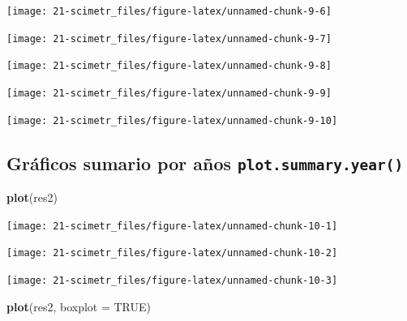 \documentclass[]{book}
\newenvironment{Shaded}{\begin{snugshade}}{\end{snugshade}}
\newcommand{\KeywordTok}[1]{\textcolor[rgb]{0.13,0.29,0.53}{\textbf{#1}}}
\newcommand{\DataTypeTok}[1]{\textcolor[rgb]{0.13,0.29,0.53}{#1}}
\newcommand{\OtherTok}[1]{\textcolor[rgb]{0.56,0.35,0.01}{#1}}
\newcommand{\NormalTok}[1]{#1}
\begin{document}
\begin{flushleft}\texttt{[image: 21-scimetr\_files/figure-latex/unnamed-chunk-9-6]} \end{flushleft}

\begin{flushleft}\texttt{[image: 21-scimetr\_files/figure-latex/unnamed-chunk-9-7]} \end{flushleft}

\begin{flushleft}\texttt{[image: 21-scimetr\_files/figure-latex/unnamed-chunk-9-8]} \end{flushleft}

\begin{flushleft}\texttt{[image: 21-scimetr\_files/figure-latex/unnamed-chunk-9-9]} \end{flushleft}

\begin{flushleft}\texttt{[image: 21-scimetr\_files/figure-latex/unnamed-chunk-9-10]} \end{flushleft}

\subsection{\texorpdfstring{Gráficos sumario por años
\texttt{plot.summary.year()}}{Gráficos sumario por años plot.summary.year()}}\label{gruxe1ficos-sumario-por-auxf1os-plot.summary.year}

\begin{Shaded}
\begin{Highlighting}[]
\KeywordTok{plot}\NormalTok{(res2)}
\end{Highlighting}
\end{Shaded}

\begin{flushleft}\texttt{[image: 21-scimetr\_files/figure-latex/unnamed-chunk-10-1]} \end{flushleft}

\begin{flushleft}\texttt{[image: 21-scimetr\_files/figure-latex/unnamed-chunk-10-2]} \end{flushleft}

\begin{flushleft}\texttt{[image: 21-scimetr\_files/figure-latex/unnamed-chunk-10-3]} \end{flushleft}

\begin{Shaded}
\begin{Highlighting}[]
\KeywordTok{plot}\NormalTok{(res2, }\DataTypeTok{boxplot =} \OtherTok{TRUE}\NormalTok{)}
\end{Highlighting}
\end{Shaded}
\end{document}
